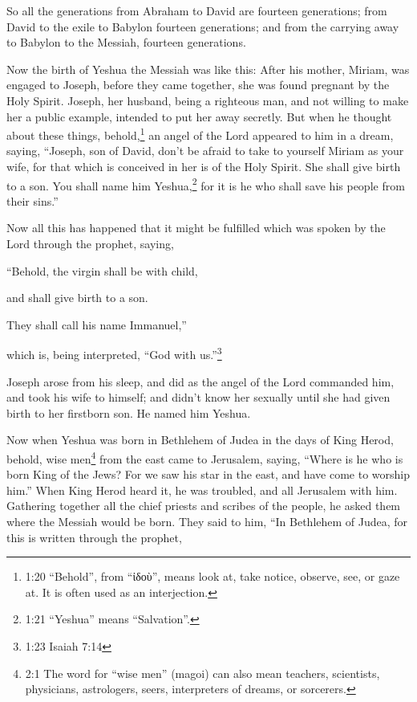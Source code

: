 \myverse{}So all the generations from Abraham to David are fourteen generations;
from David to the exile to Babylon fourteen generations; and from the carrying away to Babylon to the
Messiah, fourteen generations.

\myverse{}Now the birth of Yeshua the Messiah was like this: After his
mother, Miriam, was engaged to Joseph, before they came together, she was found pregnant by the Holy Spirit.
\myverse{}Joseph, her husband, being a righteous man, and not willing to make her a
public example, intended to put her away secretly.
\myverse{}But when he thought about these things, behold,\footnote{1:20 “Behold”, from “ἰδοὺ”, means look at, take notice, observe, see, or gaze at. It is often used
	as an interjection.} an angel of the Lord appeared to him in a dream, saying, “Joseph, son of
David, don’t be afraid to take to yourself Miriam as your wife, for that which is conceived in her is
of the Holy Spirit.
\myverse{}She shall give birth to a son. You shall name him Yeshua,\footnote{1:21 “Yeshua” means “Salvation”.} for it is he who shall save his people from their sins.”

\myverse{}Now all this has happened that it might be fulfilled which was
spoken by the Lord through the prophet, saying,

\myverse{}“Behold, the virgin shall be with child,

and shall give birth to a son.

They shall call his name Immanuel,”

which is, being interpreted, “God with us.”\footnote{1:23 Isaiah 7:14}

\myverse{}Joseph arose from his sleep, and did as the angel of the Lord
commanded him, and took his wife to himself;
\myverse{}and didn’t know her sexually until she had given birth to her firstborn son.
He named him Yeshua.


\mychapter{} \myverse*{}Now when Yeshua was born in Bethlehem of Judea in the days of King
Herod, behold, wise men\footnote{2:1 The word for “wise men” (magoi) can also mean teachers, scientists, physicians, astrologers,
	seers, interpreters of dreams, or sorcerers.} from the east came to Jerusalem, saying,
\myverse{}“Where is he who is born King of the Jews? For we saw his star in the east,
and have come to worship him.”
\myverse{}When King Herod heard it, he was troubled, and all Jerusalem with him.
\myverse{}Gathering together all the chief priests and scribes of the people, he asked
them where the Messiah would be born.
\myverse{}They said to him, “In Bethlehem of Judea, for this is written through the prophet,

